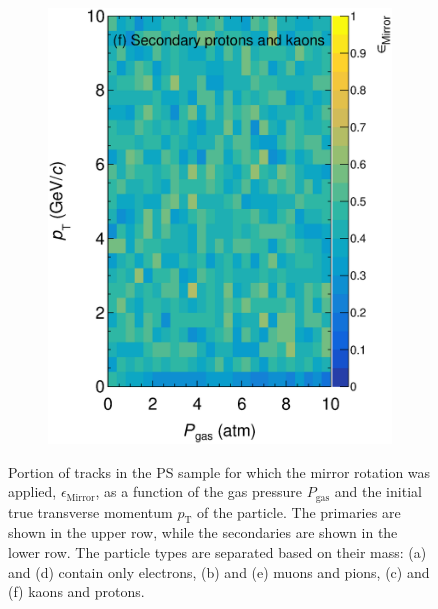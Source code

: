 \begin{figure}[!ht]
\begin{subfigure}[b]{0.32\textwidth}
         \includegraphics[width=\textwidth]{figures/ch5-KF_NDGAr/ToySample/ParScan/testTPCMirrorMirrorRatioVSpTVSdens_sec_kp.eps}
         \caption{}
         \label{fig:MirrorRation_Sec_k}
     \end{subfigure}
        \caption[Portion of tracks in the PS sample for which the mirror rotation was applied $\epsilon_\textrm{Mirror}$.]{ Portion of tracks in the PS sample for which the mirror rotation was applied, $\epsilon_\textrm{Mirror}$, as a function of the gas pressure $P_\textrm{gas}$ and the initial true transverse momentum $p_\textrm{T}$ of the particle. The primaries are shown in the upper row, while the secondaries are shown in the lower row. The particle types are separated based on their mass: (a) and (d) contain only electrons, (b) and (e) muons and pions, (c) and (f) kaons and protons.} \label{fig:MirrorRatio}
\end{figure}

